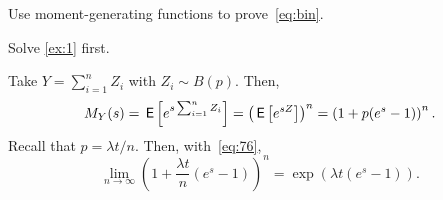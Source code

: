 \documentclass[queueing-book.tex]{subfiles}
\begin{document}
\begin{exercise}
\begin{solution}
\end{solution}
\end{exercise}


\begin{exercise} \label{ex:96}
 Use moment-generating functions to prove~\cref{eq:bin}.
\begin{hint}
Solve \cref{ex:1} first.
\end{hint}
\begin{solution}
Take $Y=\sum_{i=1}^n Z_i$ with $Z_i\sim B(p)$. Then,
\begin{equation*}
M_Y(s) = \,\mathsf{E}\left[e^{s\sum_{i=1}^n Z_i}\right] = \left(\,\mathsf{E}\left[e^{s Z}\right]\right)^n = \left(1 + p (e^s - 1)\right)^n.
\end{equation*}
Recall that $p= \lambda t/ n$. Then, with~\cref{eq:76},
\begin{equation*}
\lim_{n\to\infty} \left(1 + \frac{\lambda t}{n} (e^s - 1)\right)^n = \exp({\lambda t (e^s-1)}).
\end{equation*}
\end{solution}
\end{exercise}
\end{document}
